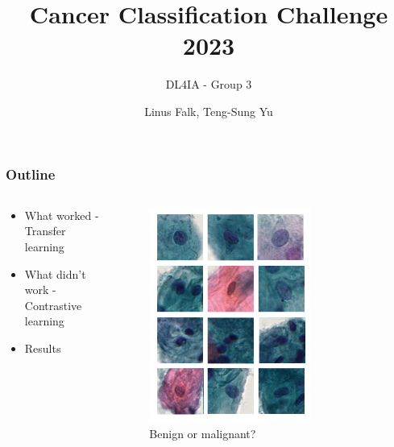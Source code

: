 \documentclass{beamer}
\begin{document}
\title{Cancer Classification Challenge 2023}
\subtitle{DL4IA - Group 3}
\author{Linus Falk, Teng-Sung Yu} %

\maketitle



\begin{frame}
\frametitle{Outline}
\begin{columns}
\begin{column}{0.5\textwidth}

\begin{itemize}
\setlength{\itemsep}{0.5em}
  \item What worked - Transfer learning
  \item What didn't work - Contrastive learning
  \item Results
\end{itemize}

\end{column}
\begin{column}{0.5\textwidth}  %
\begin{center}
    \begin{figure}
    \includegraphics[width=0.7\textwidth]{figures/benignmalign.pdf}
    \caption{Benign or malignant?}
    \end{figure}
\end{center}
\end{column}
\end{columns}
\end{frame}
\end{document}
